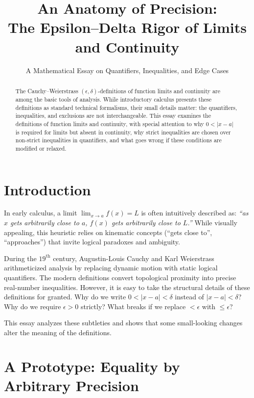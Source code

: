 \documentclass{essay}
\title{An Anatomy of Precision:\\The Epsilon--Delta Rigor of Limits and Continuity}
\subtitle{A Mathematical Essay on Quantifiers, Inequalities, and Edge Cases}
\author{}
\date{}
\begin{document}
\maketitle

\begin{abstract}
\noindent
The Cauchy--Weierstrass $(\epsilon, \delta)$-definitions of function limits and continuity are among the basic tools of analysis. While introductory calculus presents these definitions as standard technical formalisms, their small details matter: the quantifiers, inequalities, and exclusions are not interchangeable. This essay examines the definitions of function limits and continuity, with special attention to why $0 < |x - a|$ is required for limits but absent in continuity, why strict inequalities are chosen over non-strict inequalities in quantifiers, and what goes wrong if these conditions are modified or relaxed.
\end{abstract}

\tableofcontents

\section{Introduction}

In early calculus, a limit $\lim_{x \to a} f(x) = L$ is often intuitively described as: \textit{``as $x$ gets arbitrarily close to $a$, $f(x)$ gets arbitrarily close to $L$.''} While visually appealing, this heuristic relies on kinematic concepts (``gets close to'', ``approaches'') that invite logical paradoxes and ambiguity.

During the $19^\text{th}$ century, Augustin-Louis Cauchy and Karl Weierstrass arithmeticized analysis by replacing dynamic motion with static logical quantifiers. The modern definitions convert topological proximity into precise real-number inequalities. However, it is easy to take the structural details of these definitions for granted. Why do we write $0 < |x - a| < \delta$ instead of $|x - a| < \delta$? Why do we require $\epsilon > 0$ strictly? What breaks if we replace $< \epsilon$ with $\le \epsilon$?

This essay analyzes these subtleties and shows that some small-looking changes alter the meaning of the definitions.

\section{A Prototype: Equality by Arbitrary Precision}
\end{document}
